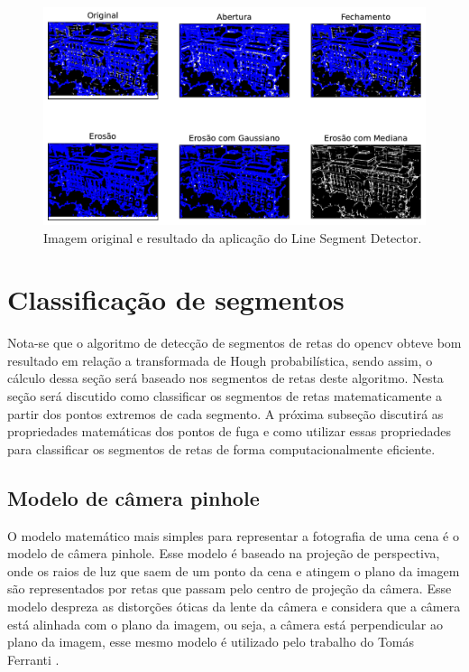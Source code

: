 \documentclass[12pt]{article}
\begin{document}
\begin{figure}
\centering
\includegraphics[scale=0.60]{lsd.pdf}
\caption{Imagem original e resultado da aplicação do Line Segment Detector.}
\label{fig:lsd}
\end{figure}


\section{Classificação de segmentos}

Nota-se que o algoritmo de detecção de segmentos de retas do opencv obteve bom resultado em relação a transformada de Hough probabilística, sendo assim, o cálculo dessa seção será baseado nos segmentos de retas deste algoritmo. Nesta seção será discutido como classificar os segmentos de retas matematicamente a partir dos pontos extremos de cada segmento. A próxima subseção discutirá as propriedades matemáticas dos pontos de fuga e como utilizar essas propriedades para classificar os segmentos de retas de forma computacionalmente eficiente.

\subsection{Modelo de câmera pinhole}

O modelo matemático mais simples para representar a fotografia de uma cena é o modelo de câmera pinhole. Esse modelo é baseado na projeção de perspectiva, onde os raios de luz que saem de um ponto da cena e atingem o plano da imagem são representados por retas que passam pelo centro de projeção da câmera. Esse modelo despreza as distorções óticas da lente da câmera e considera que a câmera está alinhada com o plano da imagem, ou seja, a câmera está perpendicular ao plano da imagem, esse mesmo modelo é utilizado pelo trabalho do Tomás Ferranti \cite{Ferranti2021}.
\end{document}
